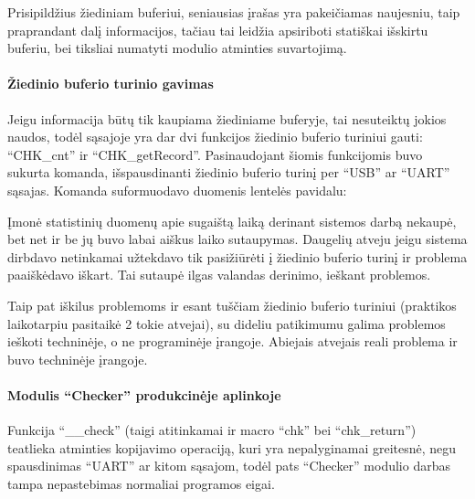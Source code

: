 \documentclass[12pt, a4paper, lithuanian, final]{article}
\begin{document}
Prisipildžius žiediniam buferiui, seniausias įrašas yra pakeičiamas naujesniu, taip praprandant dalį informacijos, tačiau tai leidžia apsiriboti statiškai išskirtu buferiu, bei tiksliai numatyti modulio atminties suvartojimą.

\paragraph{Žiedinio buferio turinio gavimas}

Jeigu informacija būtų tik kaupiama žiediniame buferyje, tai nesuteiktų jokios naudos, todėl sąsajoje yra dar dvi funkcijos žiedinio buferio turiniui gauti: "`CHK\_cnt"' ir "`CHK\_getRecord"'.
Pasinaudojant šiomis funkcijomis buvo sukurta komanda, išspausdinanti žiedinio buferio turinį per "`USB"' ar "`UART"' sąsajas.
Komanda suformuodavo duomenis lentelės pavidalu:
\begin{table}[h]
\caption{Žiedinio buferio turinio pavyzdys, kuomet nėra prijungtas sukonfigūruotas sensorius}
\end{table}

Įmonė statistinių duomenų apie sugaištą laiką derinant sistemos darbą nekaupė, bet net ir be jų buvo labai aiškus laiko sutaupymas.
Daugelių atveju jeigu sistema dirbdavo netinkamai užtekdavo tik pasižiūrėti į žiedinio buferio turinį ir problema paaiškėdavo iškart. Tai sutaupė ilgas valandas derinimo, ieškant problemos.


Taip pat iškilus problemoms ir esant tuščiam žiedinio buferio turiniui (praktikos laikotarpiu pasitaikė 2 tokie atvejai), su dideliu patikimumu galima problemos ieškoti techninėje, o ne programinėje įrangoje.
Abiejais atvejais reali problema ir buvo techninėje įrangoje.


\paragraph{Modulis "`Checker"' produkcinėje aplinkoje} Funkcija "`\_\_check"' (taigi atitinkamai ir macro "`chk"' bei "`chk\_return"') teatlieka atminties kopijavimo operaciją, kuri yra nepalyginamai greitesnė, negu spausdinimas "`UART"' ar kitom sąsajom, todėl pats "`Checker"' modulio darbas tampa nepastebimas normaliai programos eigai.
\end{document}
